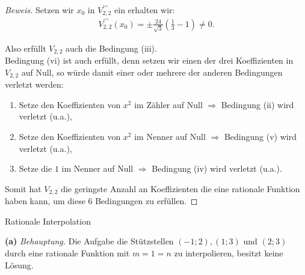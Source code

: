 \documentclass[10pt]{article}
\newcommand{\beh}{\textit{Behauptung. }}
\newenvironment{Aufgabe}[2][Aufgabe]{\begin{trivlist}
\item[\hskip \labelsep {\bfseries #1}\hskip \labelsep {\bfseries #2.}]}{\end{trivlist}}
\begin{document}
\begin{proof}[Beweis]
    Setzen wir $x_0$ in $V_{2,2}^{\prime\prime\prime}$ ein erhalten wir:
    \begin{align*}
        V_{2,2}^{\prime\prime\prime}(x_0) = \pm \frac{24}{\sqrt{3}}\left(\frac{1}{3} - 1\right) \neq 0.
    \end{align*}

    Also erfüllt $V_{2,2}$ auch die Bedingung (iii). \\
    Bedingung (vi) ist auch erfüllt, denn setzen wir einen der drei Koeffizienten in $V_{2,2}$ auf Null, 
    so würde damit einer oder mehrere der anderen Bedingungen verletzt werden: 
    \begin{enumerate}
        \item[(1)] Setze den Koeffizienten von $x^2$ im Zähler auf Null $\Longrightarrow$ Bedingung (ii) wird verletzt (u.a.),
        \item[(2)] Setze den Koeffizienten von $x^2$ im Nenner auf Null $\Longrightarrow$ Bedingung (v) wird verletzt (u.a.),
        \item[(3)] Setze die $1$ im Nenner auf Null $\Longrightarrow$ Bedingung (iv) wird verletzt (u.a.).
    \end{enumerate}
    Somit hat $V_{2,2}$ die 
    geringste Anzahl an Koeffizienten die eine rationale Funktion haben kann, um diese 6 Bedingungen zu erfüllen.
\end{proof}


\begin{Aufgabe}{3}
    Rationale Interpolation
\end{Aufgabe}

\textbf{(a)} \beh Die Aufgabe die Stützstellen $(-1; 2), (1; 3)$ und $(2; 3)$ durch eine rationale Funktion
mit $m = 1 = n$ zu interpolieren, besitzt keine Lösung.
\end{document}
